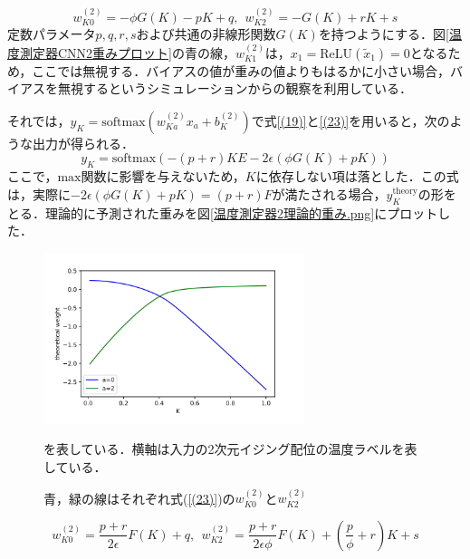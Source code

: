 \documentclass[a4paper,11pt]{jsreport}
\begin{document}
\begin{equation}
  w_{K0}^{(2)} = -\phi G(K) - pK + q, \ \
  w_{K2}^{(2)} = -G(K) + rK + s \label{(23)}
\end{equation}
定数パラメータ$p,q,r,s$および共通の非線形関数$G(K)$を持つようにする．図\ref{温度測定器CNN2重みプロット}の青の線，$w^{(2)}_{K1}$は，$x_1 = \text{ReLU}(\tilde{x}_1) = 0$となるため，ここでは無視する．バイアスの値が重みの値よりもはるかに小さい場合，バイアスを無視するというシミュレーションからの観察を利用している．\par
それでは，$y_K = \text{softmax}(w_{Ka}^{(2)}x_a + b_K^{(2)})$で式\ref{(19)}と\ref{(23)}を用いると，次のような出力が得られる．
\begin{equation}
  y_K = \text{softmax}(-(p+r)KE - 2\epsilon(\phi G(K) + pK))
\end{equation}
ここで，$\text{max}$関数に影響を与えないため，$K$に依存しない項は落とした．この式は，実際に$-2\epsilon (\phi G(K) + pK) = (p + r)F$が満たされる場合，$y_K^{\text{theory}}$の形をとる．理論的に予測された重みを図\ref{温度測定器2理論的重み.png}にプロットした．

\begin{figure}[H]
   \begin{center}
       \includegraphics[height=5cm]{image/温度測定器2理論的重み.png}
       \caption{青，緑の線はそれぞれ式(\ref{(23)})の$w_{K0}^{(2)}$と$w_{K2}^{(2)}$}を表している．横軸は入力の2次元イジング配位の温度ラベルを表している．
   \end{center}
\end{figure}

\begin{equation}
  w_{K0}^{(2)} = \frac{p+r}{2\epsilon}F(K) + q, \ \
  w_{K2}^{(2)} = \frac{p+r}{2\epsilon \phi}F(K) + \left( \frac{p}{\phi} + r \right)K + s
\end{equation}
\end{document}
